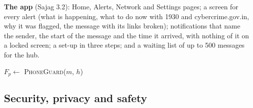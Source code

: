 \documentclass[11pt,a4paper]{article}
\begin{document}
\textbf{The app} (Sajag 3.2): Home, Alerts, Network and Settings pages; a screen for every alert (what is happening, what
to do now with 1930 and cybercrime.gov.in, why it was flagged, the message with its links broken); notifications that name
the sender, the start of the message and the time it arrived, with nothing of it on a locked screen; a set-up in three
steps; and a waiting list of up to 500 messages for the hub.

\begin{algorithm}[H]
\caption{A message on the phone, at home or away}
$F_p \leftarrow$ \textsc{PhoneGuard}($m$, $h$) 
\end{algorithm}

\subsection{Security, privacy and safety}
\label{sec:privacy}
\end{document}
